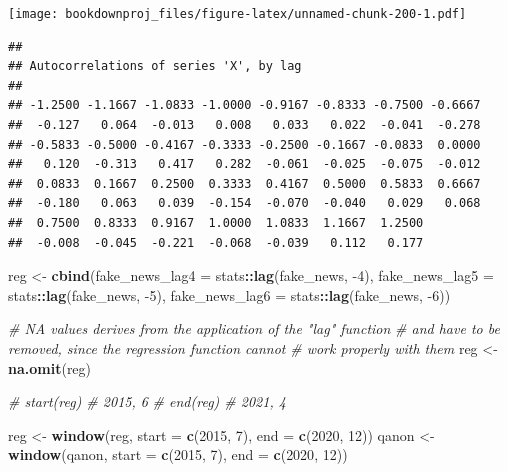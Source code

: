 \documentclass[
]{article}
\newenvironment{Shaded}{\begin{snugshade}}{\end{snugshade}}
\newcommand{\CommentTok}[1]{\textcolor[rgb]{0.56,0.35,0.01}{\textit{#1}}}
\newcommand{\DataTypeTok}[1]{\textcolor[rgb]{0.13,0.29,0.53}{#1}}
\newcommand{\DecValTok}[1]{\textcolor[rgb]{0.00,0.00,0.81}{#1}}
\newcommand{\KeywordTok}[1]{\textcolor[rgb]{0.13,0.29,0.53}{\textbf{#1}}}
\newcommand{\NormalTok}[1]{#1}
\newcommand{\OperatorTok}[1]{\textcolor[rgb]{0.81,0.36,0.00}{\textbf{#1}}}
\newcommand{\StringTok}[1]{\textcolor[rgb]{0.31,0.60,0.02}{#1}}
\begin{document}
\texttt{[image: bookdownproj\_files/figure-latex/unnamed-chunk-200-1.pdf]}

\begin{Shaded}
\end{Shaded}

\begin{verbatim}
## 
## Autocorrelations of series 'X', by lag
## 
## -1.2500 -1.1667 -1.0833 -1.0000 -0.9167 -0.8333 -0.7500 -0.6667 
##  -0.127   0.064  -0.013   0.008   0.033   0.022  -0.041  -0.278 
## -0.5833 -0.5000 -0.4167 -0.3333 -0.2500 -0.1667 -0.0833  0.0000 
##   0.120  -0.313   0.417   0.282  -0.061  -0.025  -0.075  -0.012 
##  0.0833  0.1667  0.2500  0.3333  0.4167  0.5000  0.5833  0.6667 
##  -0.180   0.063   0.039  -0.154  -0.070  -0.040   0.029   0.068 
##  0.7500  0.8333  0.9167  1.0000  1.0833  1.1667  1.2500 
##  -0.008  -0.045  -0.221  -0.068  -0.039   0.112   0.177
\end{verbatim}

\begin{Shaded}
\begin{Highlighting}[]
\NormalTok{reg <-}\StringTok{ }\KeywordTok{cbind}\NormalTok{(}\DataTypeTok{fake_news_lag4 =}\NormalTok{ stats}\OperatorTok{::}\KeywordTok{lag}\NormalTok{(fake_news, }\DecValTok{-4}\NormalTok{),}
             \DataTypeTok{fake_news_lag5 =}\NormalTok{ stats}\OperatorTok{::}\KeywordTok{lag}\NormalTok{(fake_news, }\DecValTok{-5}\NormalTok{),}
             \DataTypeTok{fake_news_lag6 =}\NormalTok{ stats}\OperatorTok{::}\KeywordTok{lag}\NormalTok{(fake_news, }\DecValTok{-6}\NormalTok{))}

\CommentTok{# NA values derives from the application of the "lag" function}
\CommentTok{# and have to be removed, since the regression function cannot}
\CommentTok{# work properly with them}
\NormalTok{reg <-}\StringTok{ }\KeywordTok{na.omit}\NormalTok{(reg)}

\CommentTok{# start(reg) # 2015, 6}
\CommentTok{# end(reg) # 2021, 4}

\NormalTok{reg <-}\StringTok{  }\KeywordTok{window}\NormalTok{(reg, }\DataTypeTok{start =} \KeywordTok{c}\NormalTok{(}\DecValTok{2015}\NormalTok{, }\DecValTok{7}\NormalTok{), }\DataTypeTok{end =} \KeywordTok{c}\NormalTok{(}\DecValTok{2020}\NormalTok{, }\DecValTok{12}\NormalTok{))}
\NormalTok{qanon <-}\StringTok{ }\KeywordTok{window}\NormalTok{(qanon, }\DataTypeTok{start =} \KeywordTok{c}\NormalTok{(}\DecValTok{2015}\NormalTok{, }\DecValTok{7}\NormalTok{), }\DataTypeTok{end =} \KeywordTok{c}\NormalTok{(}\DecValTok{2020}\NormalTok{, }\DecValTok{12}\NormalTok{))}
\end{Highlighting}
\end{Shaded}
\end{document}

